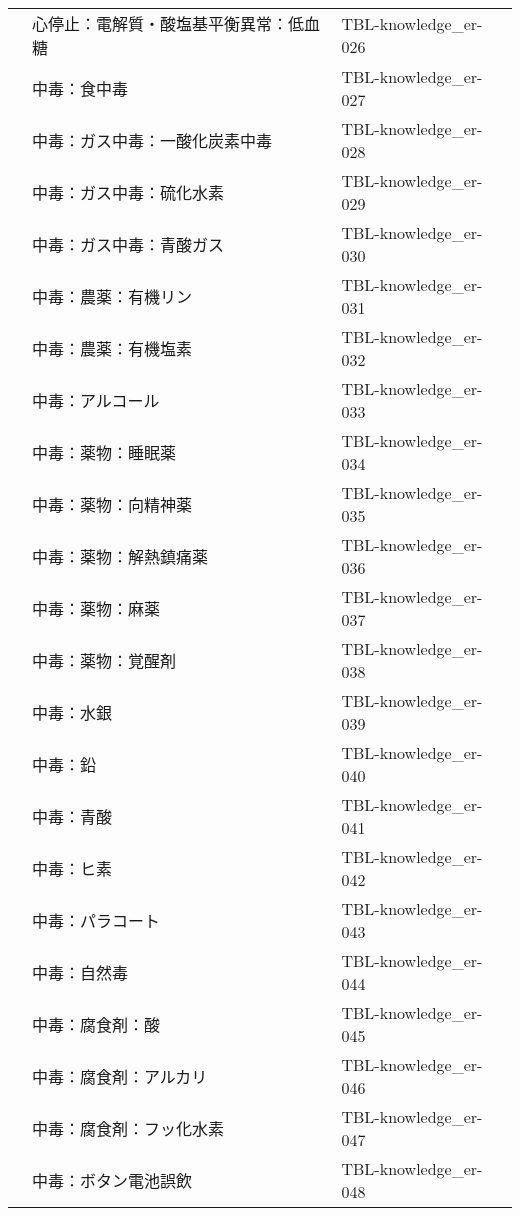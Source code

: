 \begin{xltabular}{\linewidth}{XXX}
 & 心停止：電解質・酸塩基平衡異常：低血糖 & TBL-knowledge_er-026 \\
 & 中毒：食中毒 & TBL-knowledge_er-027 \\
 & 中毒：ガス中毒：一酸化炭素中毒 & TBL-knowledge_er-028 \\
 & 中毒：ガス中毒：硫化水素 & TBL-knowledge_er-029 \\
 & 中毒：ガス中毒：青酸ガス & TBL-knowledge_er-030 \\
 & 中毒：農薬：有機リン & TBL-knowledge_er-031 \\
 & 中毒：農薬：有機塩素 & TBL-knowledge_er-032 \\
 & 中毒：アルコール & TBL-knowledge_er-033 \\
 & 中毒：薬物：睡眠薬 & TBL-knowledge_er-034 \\
 & 中毒：薬物：向精神薬 & TBL-knowledge_er-035 \\
 & 中毒：薬物：解熱鎮痛薬 & TBL-knowledge_er-036 \\
 & 中毒：薬物：麻薬 & TBL-knowledge_er-037 \\
 & 中毒：薬物：覚醒剤 & TBL-knowledge_er-038 \\
 & 中毒：水銀 & TBL-knowledge_er-039 \\
 & 中毒：鉛 & TBL-knowledge_er-040 \\
 & 中毒：青酸 & TBL-knowledge_er-041 \\
 & 中毒：ヒ素 & TBL-knowledge_er-042 \\
 & 中毒：パラコート & TBL-knowledge_er-043 \\
 & 中毒：自然毒 & TBL-knowledge_er-044 \\
 & 中毒：腐食剤：酸 & TBL-knowledge_er-045 \\
 & 中毒：腐食剤：アルカリ & TBL-knowledge_er-046 \\
 & 中毒：腐食剤：フッ化水素 & TBL-knowledge_er-047 \\
 & 中毒：ボタン電池誤飲  & TBL-knowledge_er-048 \\
\bottomrule
\end{xltabular}

